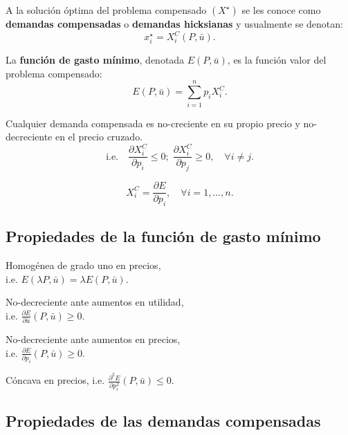 \documentclass[8pt,a4paper]{extarticle}
\begin{document}
\begin{multicols}{3}
\begin{boxdef}
	A la solución óptima del problema compensado $(X^\star)$ se les conoce como \textbf{demandas compensadas} o \textbf{demandas hicksianas} y usualmente se denotan:
\[
	x_i^\star = X_i^C (P, \bar{u})
.\] 
\end{boxdef}

\begin{boxdef}
	La \textbf{función de gasto mínimo}, denotada $E(P, \bar{u})$, es la función valor del problema compensado:
	\[
		E(P, \bar{u}) = \sum_{i=1}^{n} p_i X_i^C
	.\] 
\end{boxdef}

\begin{boxtheo}
	Cualquier demanda compensada es no-creciente en su propio precio y no-decreciente en el precio cruzado. \\
	$$\text{i.e.} \quad \frac{\partial X_i^C}{\partial p_i} \le 0; \; \frac{\partial X_i^C}{\partial p_j} \ge 0, \quad \forall i \neq j.$$
\end{boxtheo}

\begin{boxlemma}
	\[
	X^C_i = \frac{\partial E}{\partial p_i}, \quad \forall i = 1, \ldots, n
	.\] 
\end{boxlemma}

\subsection{Propiedades de la función de gasto mínimo}

\begin{eqlist}
\item Homogénea de grado uno en precios, \\ i.e. $E(\lambda P, \bar{u}) = \lambda E (P, \bar{u})$.
\item No-decreciente ante aumentos en utilidad, \\ i.e. $\displaystyle \frac{\partial E}{\partial \bar{u}} (P, \bar{u}) \geq  0$.
\item No-decreciente ante aumentos en precios, \\ i.e. $\displaystyle \frac{\partial E}{\partial p_i} (P, \bar{u}) \geq 0$.
\item Cóncava en precios, i.e. $\displaystyle \frac{\partial^2 E}{\partial p_i^2} (P, \bar{u}) \le 0$.
\end{eqlist}

\subsection{Propiedades de las demandas compensadas}


\end{multicols}
\end{document}
